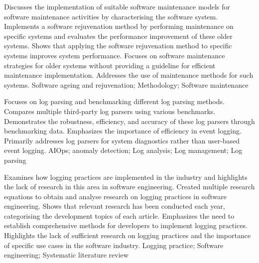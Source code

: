 {
    Discusses the implementation of suitable software maintenance models for software maintenance activities by characterising the software system.
}
{
    Implements a software rejuvenation method by performing maintenance on specific systems and evaluates the performance improvement of these older systems.
}
{
    Shows that applying the software rejuvenation method to specific systems improves system performance.
}
{
    Focuses on software maintenance strategies for older systems without providing a guideline for efficient maintenance implementation. Addresses the use of maintenance methods for such systems.
}
{
    Software ageing and rejuvenation; Methodology; Software maintenance
}

{
    Focuses on log parsing and benchmarking different log parsing methods.
}
{
    Compares multiple third-party log parsers using various benchmarks.
}
{
    Demonstrates the robustness, efficiency, and accuracy of these log parsers through benchmarking data.
}
{
    Emphasizes the importance of efficiency in event logging. Primarily addresses log parsers for system diagnostics rather than user-based event logging.
}
{
    AIOps; anomaly detection; Log analysis; Log management; Log parsing
}

{
    Examines how logging practices are implemented in the industry and highlights the lack of research in this area in software engineering.
}
{
    Created multiple research equations to obtain and analyse research on logging practices in software engineering.
}
{
    Shows that relevant research has been conducted each year, categorising the development topics of each article.
}
{
    Emphasizes the need to establish comprehensive methods for developers to implement logging practices. Highlights the lack of sufficient research on logging practices and the importance of specific use cases in the software industry.
}
{
    Logging practice; Software engineering; Systematic literature review
}

